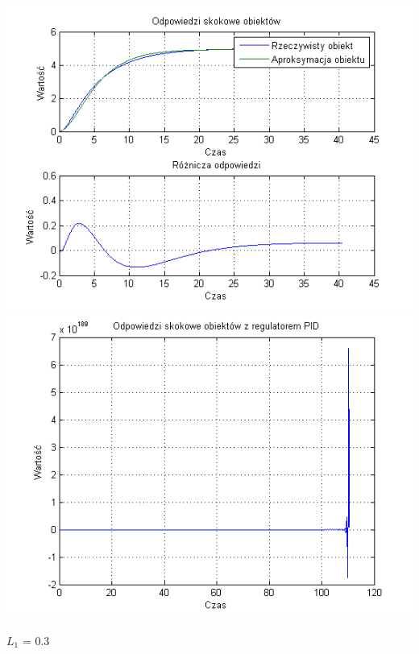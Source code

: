 \documentclass[10pt,a4paper]{article}
\begin{document}
\begin{center}
\includegraphics[scale=1]{images/dwa/skrypt_195.png}\\
\includegraphics[scale=1]{images/dwa/skrypt_196.png}\\
\end{center}
\newpage
$L_1$ = 0.3
\end{document}
